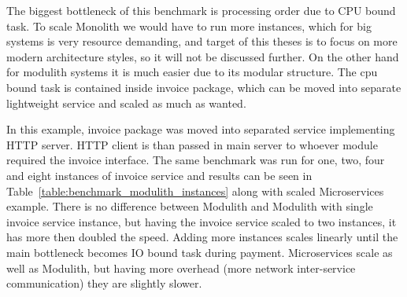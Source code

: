 The biggest bottleneck of this benchmark is processing order due to CPU bound task. To scale Monolith we would have to run more instances, which for big systems is very resource demanding, and target of this theses is to focus on more modern architecture styles, so it will not be discussed further. On the other hand for modulith systems it is much easier due to its modular structure. The cpu bound task is contained inside invoice package, which can be moved into separate lightweight service and scaled as much as wanted.

In this example, invoice package was moved into separated service implementing HTTP server. HTTP client is than passed in main server to whoever module required the invoice interface. The same benchmark was run for one, two, four and eight instances of invoice service and results can be seen in Table~\ref{table:benchmark_modulith_instances} along with scaled Microservices example. There is no difference between Modulith and Modulith with single invoice service instance, but having the invoice service scaled to two instances, it has more then doubled the speed. Adding more instances scales linearly until the main bottleneck becomes IO bound task during payment. Microservices scale as well as Modulith, but having more overhead (more network inter-service communication) they are slightly slower.

